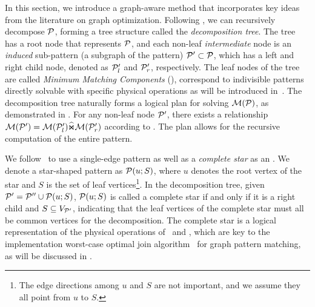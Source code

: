 In this section, we introduce a graph-aware method that incorporates key ideas from the literature on graph optimization. Following , we can recursively decompose $\mathcal{P}$, forming a tree structure called the \emph{decomposition tree}. The tree has a root node that represents $\mathcal{P}$, and each non-leaf \emph{intermediate} node is an \emph{induced} sub-pattern (a subgraph of the pattern) $\mathcal{P}' \subset \mathcal{P}$, which has a left and right child node, denoted as $\mathcal{P}'_l$ and $\mathcal{P}'_r$, respectively. %
The leaf nodes of the tree are called \emph{Minimum Matching Components} (\mmc), correspond to indivisible patterns directly solvable with specific physical operations
as will be introduced in~. The decomposition tree naturally forms a logical plan for solving $\mathcal{M}(\mathcal{P})$, as demonstrated in . For any non-leaf node $\mathcal{P}'$, there exists a relationship $\mathcal{M}(\mathcal{P}') = \mathcal{M}(\mathcal{P}'_l) \widehat{\Join} \mathcal{M}(\mathcal{P}'_r)$ according to . The plan allows for the recursive computation of the entire pattern.

We follow~\cite{huge} to use a single-edge pattern as well as a \emph{complete star} as an \mmc. We denote a star-shaped pattern as $\mathcal{P}(u;S)$, where $u$ denotes the root vertex of the star and $S$ is the set of leaf vertices\footnote{The edge directions among $u$ and $S$ are not important, and we assume they  all point from $u$ to $S$.}.
In the decomposition tree, given $\mathcal{P}' = \mathcal{P}'' \cup \mathcal{P}(u;S)$, $\mathcal{P}(u;S)$ is called a complete star if and only if it is a right child and $S \subseteq V_{\mathcal{P}'}$, indicating that the leaf vertices of the complete star must all be common vertices for the decomposition. The complete star is a logical representation of the physical operations of \expand~and \intersect, which are key to the implementation worst-case optimal join algorithm~\cite{mhedhbi2019optimizing} for graph pattern matching, as will be discussed in .

